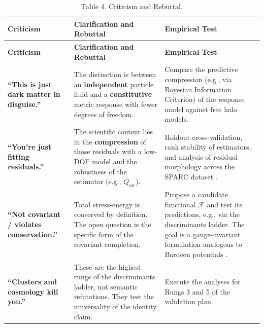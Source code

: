 \documentclass[11pt]{article}
\begin{document}
\begin{longtable}[]{@{}
  >{\raggedright\arraybackslash}p{}
  >{\raggedright\arraybackslash}p{}
  >{\raggedright\arraybackslash}p{}@{}}
\caption{\protect{}\label{_Toc222952634}{}Table 4. Criticism and Rebuttal.}\tabularnewline
\toprule\noalign{}
\begin{minipage}[b]{\linewidth}\centering
\textbf{Criticism}
\end{minipage} & \begin{minipage}[b]{\linewidth}\centering
\textbf{Clarification and Rebuttal}
\end{minipage} & \begin{minipage}[b]{\linewidth}\centering
\textbf{Empirical Test}
\end{minipage} \\
\midrule\noalign{}
\endfirsthead
\toprule\noalign{}
\begin{minipage}[b]{\linewidth}\centering
\textbf{Criticism}
\end{minipage} & \begin{minipage}[b]{\linewidth}\centering
\textbf{Clarification and Rebuttal}
\end{minipage} & \begin{minipage}[b]{\linewidth}\centering
\textbf{Empirical Test}
\end{minipage} \\
\midrule\noalign{}
\endhead
\bottomrule\noalign{}
\endlastfoot
\textbf{``This is just dark matter in disguise.''} & The distinction is between an \textbf{independent} particle fluid and a \textbf{constitutive} metric response with fewer degrees of freedom. & Compare the predictive compression (e.g., via Bayesian Information Criterion) of the response model against free halo models. \\
\textbf{``You're just fitting residuals.''} & The scientific content lies in the \textbf{compression} of those residuals with a low-DOF model and the robustness of the estimator (e.g., \(Q_{\text{est}}\)). & Holdout cross-validation, rank stability of estimators, and analysis of residual morphology across the SPARC dataset \citep{Lelli2016SPARC}. \\
\textbf{``Not covariant / violates conservation.''} & Total stress-energy is conserved by definition. The open question is the specific form of the covariant completion. & Propose a candidate functional \(\mathcal{F}\) and test its predictions, e.g., via the discriminants ladder. The goal is a gauge-invariant formulation analogous to Bardeen potentials \citep{Bardeen1980GaugeInvariant}. \\
\textbf{``Clusters and cosmology kill you.''} & These are the highest rungs of the discriminants ladder, not semantic refutations. They test the universality of the identity claim. & Execute the analyses for Rungs 3 and 5 of the validation plan. \\
\end{longtable}
\end{document}
